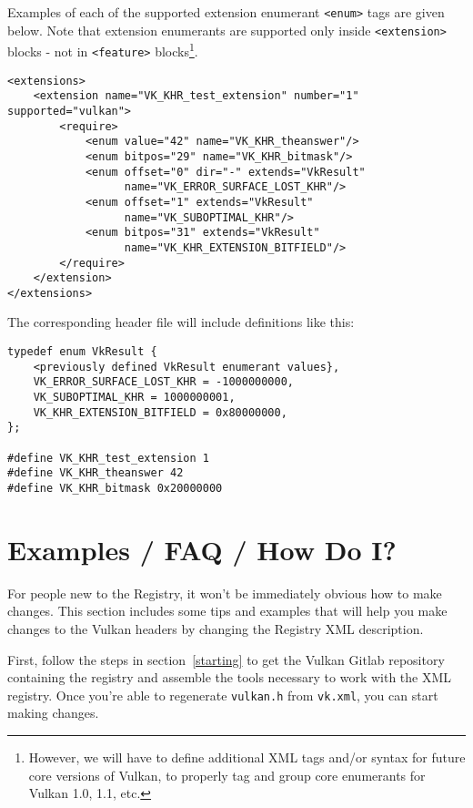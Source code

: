\documentclass{article}
\def\code#1{{\tt #1}}
\def\tag#1{{\tt <#1>\index{<#1>}}}
\begin{document}
Examples of each of the supported extension enumerant \tag{enum} tags are
given below. Note that extension enumerants are supported only inside
\tag{extension} blocks - not in \tag{feature} blocks\footnote{
    However, we will have to define additional XML tags and/or syntax for
    future core versions of Vulkan, to properly tag and group core
    enumerants for Vulkan 1.0, 1.1, etc.}.

\begin{verbatim}
<extensions>
    <extension name="VK_KHR_test_extension" number="1" supported="vulkan">
        <require>
            <enum value="42" name="VK_KHR_theanswer"/>
            <enum bitpos="29" name="VK_KHR_bitmask"/>
            <enum offset="0" dir="-" extends="VkResult"
                  name="VK_ERROR_SURFACE_LOST_KHR"/>
            <enum offset="1" extends="VkResult"
                  name="VK_SUBOPTIMAL_KHR"/>
            <enum bitpos="31" extends="VkResult"
                  name="VK_KHR_EXTENSION_BITFIELD"/>
        </require>
    </extension>
</extensions>
\end{verbatim}

The corresponding header file will include definitions like this:

\begin{verbatim}
typedef enum VkResult {
    <previously defined VkResult enumerant values},
    VK_ERROR_SURFACE_LOST_KHR = -1000000000,
    VK_SUBOPTIMAL_KHR = 1000000001,
    VK_KHR_EXTENSION_BITFIELD = 0x80000000,
};

#define VK_KHR_test_extension 1
#define VK_KHR_theanswer 42
#define VK_KHR_bitmask 0x20000000
\end{verbatim}

\clearpage
\appendix

\section{Examples / FAQ / How Do I?}
\label{examples}

For people new to the Registry, it won't be immediately obvious how to make
changes. This section includes some tips and examples that will help you
make changes to the Vulkan headers by changing the Registry XML description.

First, follow the steps in section~\ref{starting} to get the Vulkan Gitlab
repository containing the registry and assemble the tools necessary to work
with the XML registry. Once you're able to regenerate \code{vulkan.h} from
\code{vk.xml}, you can start making changes.
\end{document}
